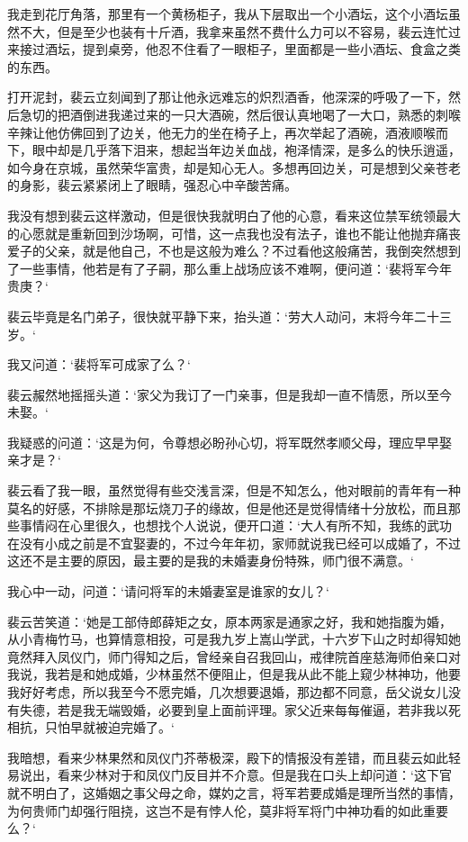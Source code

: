 我走到花厅角落，那里有一个黄杨柜子，我从下层取出一个小酒坛，这个小酒坛虽然不大，但是至少也装有十斤酒，我拿来虽然不费什么力可以不容易，裴云连忙过来接过酒坛，提到桌旁，他忍不住看了一眼柜子，里面都是一些小酒坛、食盒之类的东西。

打开泥封，裴云立刻闻到了那让他永远难忘的炽烈酒香，他深深的呼吸了一下，然后急切的把酒倒进我递过来的一只大酒碗，然后很认真地喝了一大口，熟悉的刺喉辛辣让他仿佛回到了边关，他无力的坐在椅子上，再次举起了酒碗，酒液顺喉而下，眼中却是几乎落下泪来，想起当年边关血战，袍泽情深，是多么的快乐逍遥，如今身在京城，虽然荣华富贵，却是知心无人。多想再回边关，可是想到父亲苍老的身影，裴云紧紧闭上了眼睛，强忍心中辛酸苦痛。

我没有想到裴云这样激动，但是很快我就明白了他的心意，看来这位禁军统领最大的心愿就是重新回到沙场啊，可惜，这一点我也没有法子，谁也不能让他抛弃痛丧爱子的父亲，就是他自己，不也是这般为难么？不过看他这般痛苦，我倒突然想到了一些事情，他若是有了子嗣，那么重上战场应该不难啊，便问道：‘裴将军今年贵庚？‘

裴云毕竟是名门弟子，很快就平静下来，抬头道：‘劳大人动问，末将今年二十三岁。‘

我又问道：‘裴将军可成家了么？‘

裴云赧然地摇摇头道：‘家父为我订了一门亲事，但是我却一直不情愿，所以至今未娶。‘

我疑惑的问道：‘这是为何，令尊想必盼孙心切，将军既然孝顺父母，理应早早娶亲才是？‘

裴云看了我一眼，虽然觉得有些交浅言深，但是不知怎么，他对眼前的青年有一种莫名的好感，不排除是那坛烧刀子的缘故，但是他还是觉得情绪十分放松，而且那些事情闷在心里很久，也想找个人说说，便开口道：‘大人有所不知，我练的武功在没有小成之前是不宜娶妻的，不过今年年初，家师就说我已经可以成婚了，不过这还不是主要的原因，最主要的是我的未婚妻身份特殊，师门很不满意。‘

我心中一动，问道：‘请问将军的未婚妻室是谁家的女儿？‘

裴云苦笑道：‘她是工部侍郎薛矩之女，原本两家是通家之好，我和她指腹为婚，从小青梅竹马，也算情意相投，可是我九岁上嵩山学武，十六岁下山之时却得知她竟然拜入凤仪门，师门得知之后，曾经亲自召我回山，戒律院首座慈海师伯亲口对我说，我若是和她成婚，少林虽然不便阻止，但是我从此不能上窥少林神功，他要我好好考虑，所以我至今不愿完婚，几次想要退婚，那边都不同意，岳父说女儿没有失德，若是我无端毁婚，必要到皇上面前评理。家父近来每每催逼，若非我以死相抗，只怕早就被迫完婚了。‘

我暗想，看来少林果然和凤仪门芥蒂极深，殿下的情报没有差错，而且裴云如此轻易说出，看来少林对于和凤仪门反目并不介意。但是我在口头上却问道：‘这下官就不明白了，这婚姻之事父母之命，媒妁之言，将军若要成婚是理所当然的事情，为何贵师门却强行阻挠，这岂不是有悖人伦，莫非将军将门中神功看的如此重要么？‘

